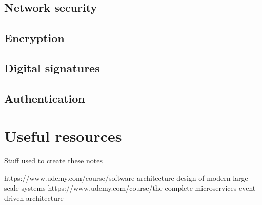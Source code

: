 \documentclass[a4paper, 11pt]{book}
\begin{document}
    \section{Network security}

    \section{Encryption}

    \section{Digital signatures}

    \section{Authentication}

    \chapter{Useful resources}
    Stuff used to create these notes

    https://www.udemy.com/course/software-architecture-design-of-modern-large-scale-systems
    https://www.udemy.com/course/the-complete-microservices-event-driven-architecture

    \newpage

\end{document}
